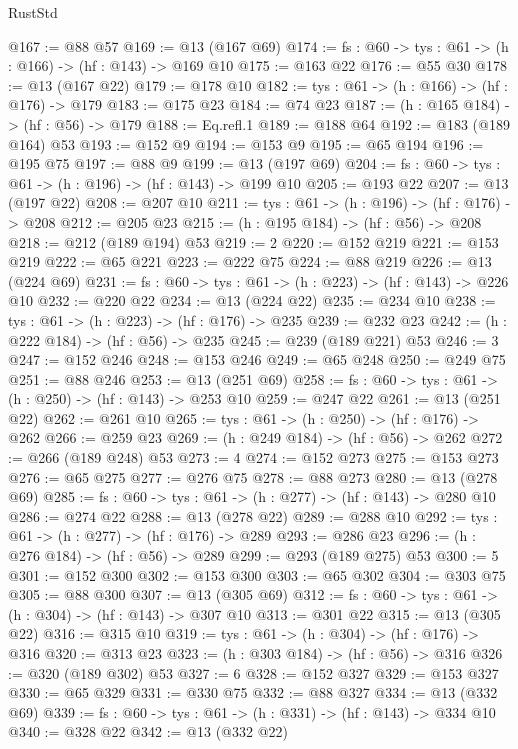 \begin{lexlean}{RustStd}
\begin{coremodule}
@167 := @88 @57
@169 := @13 (@167 @69)
@174 := {fs : @60} -> {tys : @61} -> (h : @166) -> (hf : @143) -> @169 @10
@175 := @163 @22
@176 := @55 @30
@178 := @13 (@167 @22)
@179 := @178 @10
@182 := {tys : @61} -> (h : @166) -> (hf : @176) -> @179
@183 := @175 @23
@184 := @74 @23
@187 := (h : @165 @184) -> (hf : @56) -> @179
@188 := Eq.refl.{1}
@189 := @188 @64
@192 := @183 (@189 @164) @53
@193 := @152 @9
@194 := @153 @9
@195 := @65 @194
@196 := @195 @75
@197 := @88 @9
@199 := @13 (@197 @69)
@204 := {fs : @60} -> {tys : @61} -> (h : @196) -> (hf : @143) -> @199 @10
@205 := @193 @22
@207 := @13 (@197 @22)
@208 := @207 @10
@211 := {tys : @61} -> (h : @196) -> (hf : @176) -> @208
@212 := @205 @23
@215 := (h : @195 @184) -> (hf : @56) -> @208
@218 := @212 (@189 @194) @53
@219 := 2
@220 := @152 @219
@221 := @153 @219
@222 := @65 @221
@223 := @222 @75
@224 := @88 @219
@226 := @13 (@224 @69)
@231 := {fs : @60} -> {tys : @61} -> (h : @223) -> (hf : @143) -> @226 @10
@232 := @220 @22
@234 := @13 (@224 @22)
@235 := @234 @10
@238 := {tys : @61} -> (h : @223) -> (hf : @176) -> @235
@239 := @232 @23
@242 := (h : @222 @184) -> (hf : @56) -> @235
@245 := @239 (@189 @221) @53
@246 := 3
@247 := @152 @246
@248 := @153 @246
@249 := @65 @248
@250 := @249 @75
@251 := @88 @246
@253 := @13 (@251 @69)
@258 := {fs : @60} -> {tys : @61} -> (h : @250) -> (hf : @143) -> @253 @10
@259 := @247 @22
@261 := @13 (@251 @22)
@262 := @261 @10
@265 := {tys : @61} -> (h : @250) -> (hf : @176) -> @262
@266 := @259 @23
@269 := (h : @249 @184) -> (hf : @56) -> @262
@272 := @266 (@189 @248) @53
@273 := 4
@274 := @152 @273
@275 := @153 @273
@276 := @65 @275
@277 := @276 @75
@278 := @88 @273
@280 := @13 (@278 @69)
@285 := {fs : @60} -> {tys : @61} -> (h : @277) -> (hf : @143) -> @280 @10
@286 := @274 @22
@288 := @13 (@278 @22)
@289 := @288 @10
@292 := {tys : @61} -> (h : @277) -> (hf : @176) -> @289
@293 := @286 @23
@296 := (h : @276 @184) -> (hf : @56) -> @289
@299 := @293 (@189 @275) @53
@300 := 5
@301 := @152 @300
@302 := @153 @300
@303 := @65 @302
@304 := @303 @75
@305 := @88 @300
@307 := @13 (@305 @69)
@312 := {fs : @60} -> {tys : @61} -> (h : @304) -> (hf : @143) -> @307 @10
@313 := @301 @22
@315 := @13 (@305 @22)
@316 := @315 @10
@319 := {tys : @61} -> (h : @304) -> (hf : @176) -> @316
@320 := @313 @23
@323 := (h : @303 @184) -> (hf : @56) -> @316
@326 := @320 (@189 @302) @53
@327 := 6
@328 := @152 @327
@329 := @153 @327
@330 := @65 @329
@331 := @330 @75
@332 := @88 @327
@334 := @13 (@332 @69)
@339 := {fs : @60} -> {tys : @61} -> (h : @331) -> (hf : @143) -> @334 @10
@340 := @328 @22
@342 := @13 (@332 @22)

\end{coremodule}
\end{lexlean}
